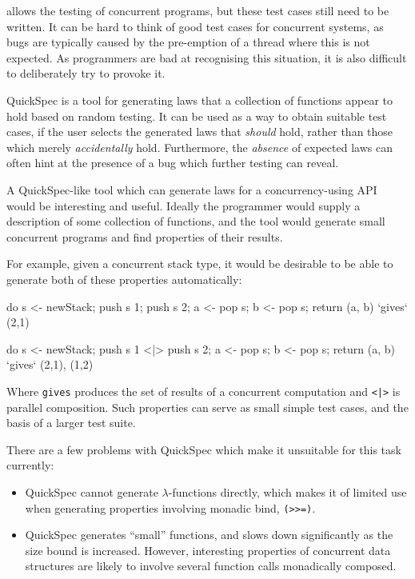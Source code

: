 \dejafu{} allows the testing of concurrent programs, but these test
cases still need to be written. It can be hard to think of good test
cases for concurrent systems, as bugs are typically caused by the
pre-emption of a thread where this is not expected. As programmers are
bad at recognising this situation, it is also difficult to
deliberately try to provoke it.

QuickSpec \citep{quickspec} is a tool for generating laws that a
collection of functions appear to hold based on random testing. It can
be used as a way to obtain suitable test cases, if the user selects
the generated laws that \emph{should} hold, rather than those which
merely \emph{accidentally} hold. Furthermore, the \emph{absence} of
expected laws can often hint at the presence of a bug which further
testing can reveal.

A QuickSpec-like tool which can generate laws for a concurrency-using
API would be interesting and useful. Ideally the programmer would
supply a description of some collection of functions, and the tool
would generate small concurrent programs and find properties of their
results.

For example, given a concurrent stack type, it would be desirable to
be able to generate both of these properties automatically:

\begin{haskellcode}
do { s <- newStack; push s 1; push s 2; a <- pop s; b <- pop s; return (a, b) }
  `gives` {(2,1)}

do { s <- newStack; push s 1 <|> push s 2; a <- pop s; b <- pop s; return (a, b) }
  `gives` {(2,1), (1,2)}
\end{haskellcode}

Where \verb|gives| produces the set of results of a concurrent
computation and \verb+<|>+ is parallel composition. Such properties
can serve as small simple test cases, and the basis of a larger test
suite.

There are a few problems with QuickSpec which make it unsuitable for
this task currently:

\begin{itemize}
\item QuickSpec cannot generate $\lambda$-functions directly, which
  makes it of limited use when generating properties involving monadic
  bind, \verb|(>>=)|.

\item QuickSpec generates ``small'' functions, and slows down
  significantly as the size bound is increased. However, interesting
  properties of concurrent data structures are likely to involve
  several function calls monadically composed.
\end{itemize}

